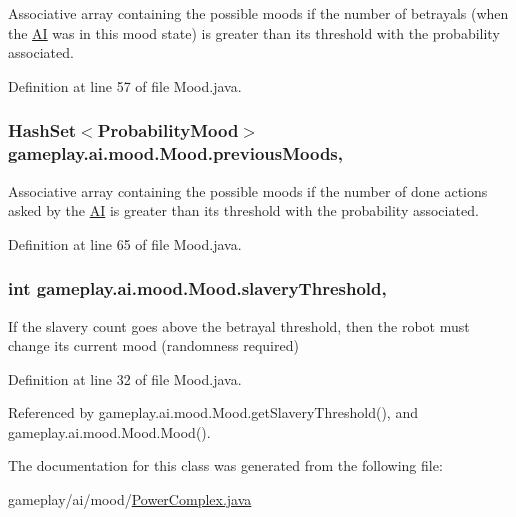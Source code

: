 Associative array containing the possible moods if the number of betrayals (when the \hyperlink{a00001}{A\-I} was in this mood state) is greater than its threshold with the probability associated. 



Definition at line 57 of file Mood.\-java.

\hypertarget{a00015_a5c8758b18bb740a2fd1edf8d57a5ab27}{
\subsubsection[{previous\-Moods}]{\setlength{\rightskip}{0pt plus 5cm}Hash\-Set$<${\bf Probability\-Mood}$>$ gameplay.\-ai.\-mood.\-Mood.\-previous\-Moods\hspace{0.3cm}{\ttfamily [protected]}, {\ttfamily [inherited]}}}\label{a00015_a5c8758b18bb740a2fd1edf8d57a5ab27}


Associative array containing the possible moods if the number of done actions asked by the \hyperlink{a00001}{A\-I} is greater than its threshold with the probability associated. 



Definition at line 65 of file Mood.\-java.

\hypertarget{a00015_a12c9abed7c077f9013956cda08e41619}{
\subsubsection[{slavery\-Threshold}]{\setlength{\rightskip}{0pt plus 5cm}int gameplay.\-ai.\-mood.\-Mood.\-slavery\-Threshold\hspace{0.3cm}{\ttfamily [protected]}, {\ttfamily [inherited]}}}\label{a00015_a12c9abed7c077f9013956cda08e41619}


If the slavery count goes above the betrayal threshold, then the robot must change its current mood (randomness required) 



Definition at line 32 of file Mood.\-java.



Referenced by gameplay.\-ai.\-mood.\-Mood.\-get\-Slavery\-Threshold(), and gameplay.\-ai.\-mood.\-Mood.\-Mood().



The documentation for this class was generated from the following file\-:\begin{DoxyCompactItemize}
\item 
gameplay/ai/mood/\hyperlink{a00048}{Power\-Complex.\-java}\end{DoxyCompactItemize}
